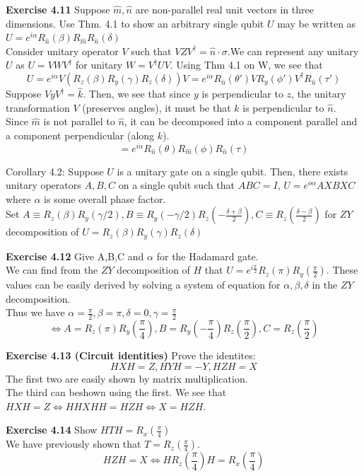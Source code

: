 \documentclass{article}
\begin{document}
\begin{tcolorbox}\textbf{Exercise 4.11} Suppose $\hat{m}, \hat{n}$ are non-parallel real unit vectors in three dimensions. Use Thm. 4.1 to show an arbitrary single qubit $U$ may be written as $U = e^{i\alpha} R_{\hat{n}}(\beta) R_{\hat{m}} R_{\hat{n}}(\delta)$\\
	Consider unitary operator $V$ such that $VZV^\dag = \hat{n} \cdot \sigma$.We can represent any unitary $U$ as $U = VWV^\dag$ for unitary $W = V^\dag U V$. Using Thm 4.1 on W,  we see that
	$$U = e^{i\alpha}V(R_z(\beta) R_y (\gamma) R_z(\delta))V = e^{i\alpha} R_{\hat{n}}(\theta') VR_y (\phi')V^\dag R_{\hat{n}} (\tau')$$
	Suppose $VyV^\dag = \hat{k}$. Then, we see that since $y$ is perpendicular to $z$, the unitary transformation $V$ (preserves angles), it must be that $k$ is perpendicular to $\hat{n}$. Since $\hat{m}$ is not parallel to $\hat{n}$, it can be decomposed into a component parallel and a component perpendicular (along $k$).
	$$= e^{i\alpha} R_{\hat{n}}(\theta) R_{\hat{m}} (\phi) R_{\hat{n}}(\tau)$$
\end{tcolorbox}
Corollary 4.2: Suppose $U$ is a unitary gate on a single qubit. Then, there exists unitary operators $A,B,C$ on a single qubit such that $ABC = I$, $U = e^{o\alpha} AXBXC$ where $\alpha$ is some overall phase factor.\\
Set $A \equiv R_z(\beta)R_y(\gamma/2), B\equiv R_y(-\gamma/2)R_z(-\frac{\delta+\beta}{2}), C \equiv R_z(\frac{\delta-\beta}{2})$ for $ZY$ decomposition of $U = R_z(\beta) R_y(\gamma) R_z(\delta)$
\begin{tcolorbox}\textbf{Exercise 4.12} Give A,B,C and $\alpha$ for the Hadamard gate.\\
	We can find from the $ZY$ decomposition of $H$ that $U = e^{i\frac{\pi}{2}} R_z(\pi) R_y(\frac{\pi}{2})$. These values can be easily derived by solving a system of equation for $\alpha, \beta, \delta$ in the $ZY$ decomposition. \\
	Thus we have $\alpha = \frac{\pi}{2}, \beta = \pi, \delta =0, \gamma = \frac{\pi}{2}$
	$$\iff A= R_z(\pi)R_y(\frac{\pi}{4}), B = R_y(-\frac{\pi}{4})R_z(\frac{\pi}{2}), C = R_z(\frac{\pi}{2})$$
\end{tcolorbox}
\begin{tcolorbox}\textbf{Exercise 4.13 (Circuit identities)} Prove the identites:
	$$HXH = Z, HYH = -Y, HZH = X$$
The first two are easily shown by matrix multiplication.\\
The third can beshown using the first. We see that $HXH = Z \iff HHXHH = HZH \iff X = HZH$.
\end{tcolorbox}
\begin{tcolorbox}\textbf{Exercise 4.14} Show $HTH = R_x(\frac{\pi}{4})$\\
	We have previously shown that $T = R_z(\frac{\pi}{4})$.
	$$HZH = X \iff HR_z(\frac{\pi}{4})H = R_x(\frac{\pi}{4})$$
\end{tcolorbox}
\end{document}
